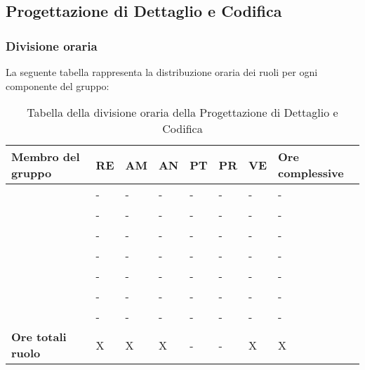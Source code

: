 \subsection{Progettazione di Dettaglio e Codifica}

\subsubsection{Divisione oraria}
La seguente tabella rappresenta la distribuzione oraria dei ruoli per ogni componente del gruppo:
{
	\renewcommand{\arraystretch}{2}
	\begin{longtable}[h!] { C{4cm} C{1cm} C{1cm} C{1cm} C{1cm} C{1cm} C{1cm} C{3cm}}
	\caption{Tabella della divisione oraria della Progettazione di Dettaglio e Codifica}\\
	\rowcolor{\primaryColor}
	
	\textcolor{\secondaryColor}{\textbf{Membro del gruppo}} & 
	\textcolor{\secondaryColor}{\textbf{RE}} & 
	\textcolor{\secondaryColor}{\textbf{AM}} & 
	\textcolor{\secondaryColor}{\textbf{AN}} & 
	\textcolor{\secondaryColor}{\textbf{PT}} & 
	\textcolor{\secondaryColor}{\textbf{PR}} & 
	\textcolor{\secondaryColor}{\textbf{VE}} & 
	\textcolor{\secondaryColor}{\textbf{Ore complessive}}\\	
	\endhead
	
	\AD{}                     &  - &  - &  - & - & - & - & - \\
	\AT{}                     &  - &  - &  - & - & - & - & - \\
	\AW{}                     &  - &  - &  - & - & - & - & - \\
	\EC{}                     &  - &  - &  - & - & - & - & - \\
	\EM{}                     &  - &  - &  - & - & - & - & - \\
	\FP{}                     &  - &  - &  - & - & - & - & - \\
	\GG{}                     &  - &  - &  - & - & - & - & - \\
	\textbf{Ore totali ruolo} & X & X & X & - & - & X & X \\
	
	\end{longtable}
}

